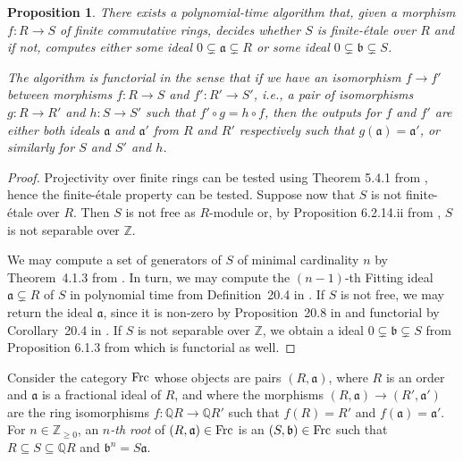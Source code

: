 \documentclass{amsart}
\theoremstyle{plain}
\newtheorem{proposition}[theorem]{Proposition}
\theoremstyle{definition}
\newcommand{\Z}{\ensuremath{\mathbb{Z}}}
\newcommand{\Q}{\ensuremath{\mathbb{Q}}}
\begin{document}
\begin{proposition}
\label{prop:alg_etale_or_else}
There exists a polynomial-time algorithm that, given a morphism $f:R\to S$ of finite commutative rings,
decides whether \(S\) is finite-\'etale over \(R\) and if not, computes either some ideal \(0\subsetneq \mathfrak{a}\subsetneq R\) or some ideal \(0\subsetneq \mathfrak{b}\subsetneq S\).

The algorithm is functorial in the sense that if we have an isomorphism $f\to f'$ between morphisms $f:R\to S$ and $f':R'\to S'$, i.e., a pair of isomorphisms $g:R\to R'$ and $h:S\to S'$ such that $f'\circ g = h\circ f$, then the outputs for $f$ and $f'$ are either both ideals $\mathfrak{a}$ and $\mathfrak{a}'$ from $R$ and $R'$ respectively such that $g(\mathfrak{a})=\mathfrak{a}'$, or similarly for $S$ and $S'$ and $h$.
\end{proposition}
\begin{proof}
Projectivity over finite rings can be tested using Theorem 5.4.1 from \cite{Iuliana}, hence the finite-\'etale property can be tested. Suppose now that \(S\) is not finite-\'etale over \(R\).
Then \(S\) is not free as \(R\)-module or, by Proposition 6.2.14.ii from \cite{Iuliana}, \(S\) is not separable over \(\Z\).

We may compute a set of generators of \(S\) of minimal cardinality \(n\) by Theorem~4.1.3 from \cite{Iuliana}. 
In turn, we may compute the \((n-1)\)-th Fitting ideal \(\mathfrak{a}\subsetneq R\) of \(S\) in polynomial time from Definition~20.4 in \cite{Eisenbud}.
If \(S\) is not free, we may return the ideal \(\mathfrak{a}\), since it is non-zero by Proposition~20.8 in \cite{Eisenbud} and functorial by Corollary~20.4 in \cite{Eisenbud}. 
If \(S\) is not separable over \(\Z\), we obtain a ideal \(0\subsetneq \mathfrak{b} \subsetneq S\) from Proposition 6.1.3 from \cite{Iuliana} which is functorial as well.
\end{proof}

Consider the category $\textup{Frc}$ whose objects are pairs $(R,\mathfrak{a})$, where $R$ is an order and $\mathfrak{a}$ is a fractional ideal of $R$, and where the morphisms $(R,\mathfrak{a})\to(R',\mathfrak{a}')$ are the ring isomorphisms $f:\Q R\to \Q R'$ such that $f(R)=R'$ and $f(\mathfrak{a})=\mathfrak{a}'$. 
For $n\in\Z_{\geq 0}$, an \emph{$n$-th root} of $(R,\mathfrak{a})\in\textup{Frc}$ is an $(S,\mathfrak{b})\in\textup{Frc}$ such that $R\subseteq S\subseteq \Q R$ and $\mathfrak{b}^n=S\mathfrak{a}$.
\end{document}
